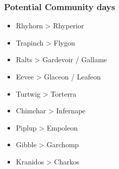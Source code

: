 \documentclass[12pt,UTF8,nofonts]{beamer}
\begin{document}
\begin{frame}
\frametitle{Potential Community days}

\begin{block}{}
\begin{footnotesize}

\begin{itemize}
  \item Rhyhorn > Rhyperior
  \item Trapinch > Flygon
  \item Ralts > Gardevoir / Gallame
  \item Eevee > Glaceon / Leafeon
  \item Turtwig > Torterra
  \item Chimchar > Infernape 
  \item Piplup > Empoleon
  \item Gibble > Garchomp
  \item Kranidos > Charkos
\end{itemize}

\end{footnotesize}
\end{block}
\end{frame}
\end{document}
